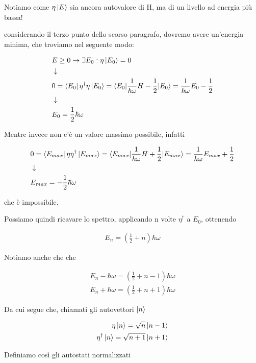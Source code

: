 Notiamo come $\eta \ket{E}$ sia ancora autovalore di H, ma di un livello ad energia più bassa!

considerando il terzo punto dello scorso paragrafo, dovremo avere un'energia minima, che troviamo nel seguente modo: 

\begin{align}
{}&E \geq 0 \rightarrow \exists E_0: \eta \ket{E_0}=0 \\
&\downarrow \nonumber \\
&0=\bra{E_0}\eta^\dagger\eta \ket{E_0} = \braket{E_0|\frac{1}{\hbar\omega}H -\frac{1}{2}|E_0}= \frac{1}{\hbar\omega}E_0 -\frac{1}{2} \nonumber\\
&\downarrow \nonumber \\
& E_0= \frac{1}{2}\hbar\omega
\end{align}

Mentre invece non c'è un valore massimo possibile, infatti

\begin{align}
{}&0=\bra{E_{max}}\eta\eta^\dagger \ket{E_{max}} = \braket{E_{max}|\frac{1}{\hbar\omega}H +\frac{1}{2}|E_{max}}= \frac{1}{\hbar\omega}E_{max}+\frac{1}{2} \nonumber\\
&\downarrow \nonumber \\
& E_{max}= -\frac{1}{2}\hbar\omega
\end{align}

che è impossibile. 
 
Possiamo quindi ricavare lo spettro, applicando n volte $\eta^\dagger$ a $E_0$, ottenendo

\begin{align}
E_n= \left(\frac{1}{2}+n\right)\hbar\omega
\end{align}

Notiamo anche che che

\begin{align}
E_n-\hbar \omega = \left(\frac{1}{2}+n - 1\right)\hbar\omega \\
E_n+\hbar \omega = \left(\frac{1}{2}+n + 1\right)\hbar\omega
\end{align}

\newpage
Da cui segue che, chiamati gli autovettori $\ket{n}$

\begin{align}
\eta \ket{n}=\sqrt{n}\ket{n- 1}\\
\eta^\dagger  \ket{n}= \sqrt{n+1}\ket{n+ 1}
\end{align}

Definiamo così gli autostati normalizzati

